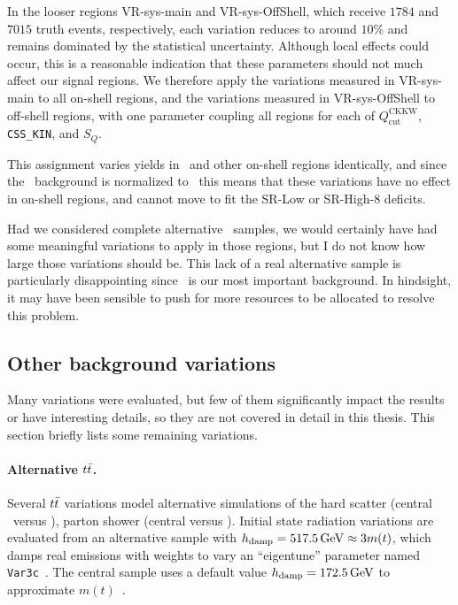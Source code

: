 In the looser regions VR-sys-main and VR-sys-OffShell,
which receive $1784$ and $7015$ truth events, respectively, each variation
reduces to around $10\%$ and remains dominated by the statistical uncertainty.
Although local effects could occur, this is a reasonable indication that these
parameters should not much affect our signal regions.
We therefore apply the variations measured in VR-sys-main to all on-shell
regions,
and the variations measured in VR-sys-OffShell to off-shell regions,
with one parameter coupling all regions for each of
$Q_\textrm{cut}^\textrm{CKKW}$,
\texttt{CSS\_KIN}, and
$S_Q$.

This assignment varies yields in \crvz\ and other on-shell regions identically,
and since the \diboson\ background is normalized to \crvz\ this means that
these variations have no effect in on-shell regions, and cannot move to
fit the SR-Low or SR-High-8 deficits.

Had we considered complete alternative \diboson\ samples, we would certainly
have had some meaningful variations to apply in those regions, but I do not
know how large those variations should be.
This lack of a real alternative sample is particularly disappointing since
\diboson\ is our most important background.
In hindsight, it may have been sensible to push for more resources to be
allocated to resolve this problem.

\subsection{Other background variations}
\label{sec:2ljets_other_background_variations}
Many variations were evaluated, but few of them significantly impact the
results or have interesting details, so they are not covered in detail in
this thesis.
This section briefly lists some remaining variations.

\paragraph{Alternative $\ttbar$.}
Several $\ttbar$ variations model alternative simulations of the
hard scatter (central \powheg\ versus \amcatnlo),
parton shower (central  versus ).
Initial state radiation variations are evaluated from an alternative
sample with $h_\textrm{damp} = 517.5\,\eV[G] \approx 3m(t)$,
which damps real emissions with weights to vary an ``eigentune'' parameter
named \texttt{Var3c}~\cite{ATL-PHYS-PUB-2014-021}.
The central sample uses a default value $h_\textrm{damp} = 172.5\,\eV[G]$ to
approximate $m(t)$~\cite{CMS-PAS-TOP-16-021}.

